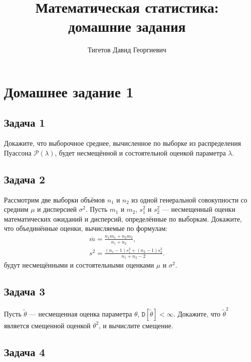 \documentclass[a4paper,12pt]{article}
\newcommand{\variance}[1]{\mathtt{D} \left[ #1 \right]}
\begin{document}
\title{Математическая статистика: домашние задания}
\author{Тигетов Давид Георгиевич}
\maketitle

\section*{Домашнее задание 1}

\subsection*{Задача 1 \cite[108]{Efimov}}

Докажите, что выборочное среднее, вычисленное по выборке из распределения Пуассона $\mathcal{P}(\lambda)$, будет несмещённой и состоятельной оценкой
параметра $\lambda$.

\subsection*{Задача 2 \cite[103]{Efimov}}

Рассмотрим две выборки объёмов $n_1$ и $n_2$ из одной генеральной совокупности со средним $\mu$ и дисперсией $\sigma^2$.
Пусть $m_1$ и $m_2$, $s_1^2$ и $s_2^2$ --- несмещенный оценки математических ожиданий и дисперсий, определённые по выборкам. Докажите, что
объединённые оценки, вычисляемые по формулам:
\begin{gather*}
    \overline{m} = \frac{n_1 m_1 + n_2 m_2}{n_1 + n_2} , \\
    s^2 = \frac{(n_1 - 1) s_1^2 + (n_2 - 1) s_2^2}{n_1 + n_2 - 2} .
\end{gather*}
будут несмещёнными и состоятельными оценками $\mu$ и $\sigma^2$.

\subsection*{Задача 3 \cite[107]{Efimov}}

Пусть $\widetilde{\theta}$ --- несмещенная оценка параметра $\theta$, $\variance{\widetilde{\theta}} < \infty$. Докажите, что
$\widetilde{\theta}^2$ является смещенной оценкой $\theta^2$, и вычислите смещение.

\subsection*{Задача 4 \cite[110]{Efimov}}
\end{document}
